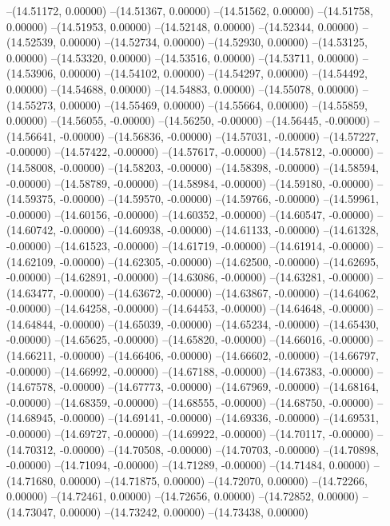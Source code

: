 --(14.51172, 0.00000)
--(14.51367, 0.00000)
--(14.51562, 0.00000)
--(14.51758, 0.00000)
--(14.51953, 0.00000)
--(14.52148, 0.00000)
--(14.52344, 0.00000)
--(14.52539, 0.00000)
--(14.52734, 0.00000)
--(14.52930, 0.00000)
--(14.53125, 0.00000)
--(14.53320, 0.00000)
--(14.53516, 0.00000)
--(14.53711, 0.00000)
--(14.53906, 0.00000)
--(14.54102, 0.00000)
--(14.54297, 0.00000)
--(14.54492, 0.00000)
--(14.54688, 0.00000)
--(14.54883, 0.00000)
--(14.55078, 0.00000)
--(14.55273, 0.00000)
--(14.55469, 0.00000)
--(14.55664, 0.00000)
--(14.55859, 0.00000)
--(14.56055, -0.00000)
--(14.56250, -0.00000)
--(14.56445, -0.00000)
--(14.56641, -0.00000)
--(14.56836, -0.00000)
--(14.57031, -0.00000)
--(14.57227, -0.00000)
--(14.57422, -0.00000)
--(14.57617, -0.00000)
--(14.57812, -0.00000)
--(14.58008, -0.00000)
--(14.58203, -0.00000)
--(14.58398, -0.00000)
--(14.58594, -0.00000)
--(14.58789, -0.00000)
--(14.58984, -0.00000)
--(14.59180, -0.00000)
--(14.59375, -0.00000)
--(14.59570, -0.00000)
--(14.59766, -0.00000)
--(14.59961, -0.00000)
--(14.60156, -0.00000)
--(14.60352, -0.00000)
--(14.60547, -0.00000)
--(14.60742, -0.00000)
--(14.60938, -0.00000)
--(14.61133, -0.00000)
--(14.61328, -0.00000)
--(14.61523, -0.00000)
--(14.61719, -0.00000)
--(14.61914, -0.00000)
--(14.62109, -0.00000)
--(14.62305, -0.00000)
--(14.62500, -0.00000)
--(14.62695, -0.00000)
--(14.62891, -0.00000)
--(14.63086, -0.00000)
--(14.63281, -0.00000)
--(14.63477, -0.00000)
--(14.63672, -0.00000)
--(14.63867, -0.00000)
--(14.64062, -0.00000)
--(14.64258, -0.00000)
--(14.64453, -0.00000)
--(14.64648, -0.00000)
--(14.64844, -0.00000)
--(14.65039, -0.00000)
--(14.65234, -0.00000)
--(14.65430, -0.00000)
--(14.65625, -0.00000)
--(14.65820, -0.00000)
--(14.66016, -0.00000)
--(14.66211, -0.00000)
--(14.66406, -0.00000)
--(14.66602, -0.00000)
--(14.66797, -0.00000)
--(14.66992, -0.00000)
--(14.67188, -0.00000)
--(14.67383, -0.00000)
--(14.67578, -0.00000)
--(14.67773, -0.00000)
--(14.67969, -0.00000)
--(14.68164, -0.00000)
--(14.68359, -0.00000)
--(14.68555, -0.00000)
--(14.68750, -0.00000)
--(14.68945, -0.00000)
--(14.69141, -0.00000)
--(14.69336, -0.00000)
--(14.69531, -0.00000)
--(14.69727, -0.00000)
--(14.69922, -0.00000)
--(14.70117, -0.00000)
--(14.70312, -0.00000)
--(14.70508, -0.00000)
--(14.70703, -0.00000)
--(14.70898, -0.00000)
--(14.71094, -0.00000)
--(14.71289, -0.00000)
--(14.71484, 0.00000)
--(14.71680, 0.00000)
--(14.71875, 0.00000)
--(14.72070, 0.00000)
--(14.72266, 0.00000)
--(14.72461, 0.00000)
--(14.72656, 0.00000)
--(14.72852, 0.00000)
--(14.73047, 0.00000)
--(14.73242, 0.00000)
--(14.73438, 0.00000)
